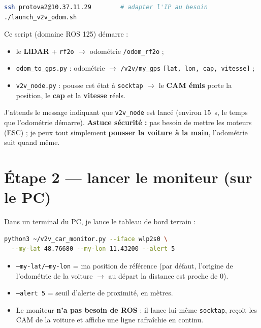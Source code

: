 \documentclass[a4paper,11pt]{article}
\newcommand{\code}[1]{\texttt{#1}}
\begin{document}
\begin{lstlisting}[language=bash]
ssh protova2@10.37.11.29        # adapter l'IP au besoin
./launch_v2v_odom.sh
\end{lstlisting}

Ce script (domaine ROS 125) démarre :
\begin{itemize}[leftmargin=1.6em]
  \item le \textbf{LiDAR} + \code{rf2o} $\rightarrow$ odométrie \code{/odom\_rf2o} ;
  \item \code{odom\_to\_gps.py} : odométrie $\rightarrow$ \code{/v2v/my\_gps}
        \code{[lat, lon, cap, vitesse]} ;
  \item \code{v2v\_node.py} : pousse cet état à \code{socktap} $\rightarrow$ le \textbf{CAM
        émis} porte la position, le \textbf{cap} et la \textbf{vitesse} réels.
\end{itemize}
J'attends le message indiquant que \code{v2v\_node} est lancé (environ 15~s, le temps que
l'odométrie démarre). \textbf{Astuce sécurité :} pas besoin de mettre les moteurs (ESC) ;
je peux tout simplement \textbf{pousser la voiture à la main}, l'odométrie suit quand même.

\section{Étape 2 --- lancer le moniteur (sur le PC)}
Dans un terminal du PC, je lance le tableau de bord terrain :

\begin{lstlisting}[language=bash]
python3 ~/v2v_car_monitor.py --iface wlp2s0 \
  --my-lat 48.76680 --my-lon 11.43200 --alert 5
\end{lstlisting}

\begin{itemize}[leftmargin=1.6em]
  \item \code{--my-lat/--my-lon} = ma position de référence (par défaut, l'origine de
        l'odométrie de la voiture $\rightarrow$ au départ la distance est proche de 0).
  \item \code{--alert 5} = seuil d'alerte de proximité, en mètres.
  \item Le moniteur \textbf{n'a pas besoin de ROS} : il lance lui-même \code{socktap},
        reçoit les CAM de la voiture et affiche une ligne rafraîchie en continu.
\end{itemize}

\end{document}

